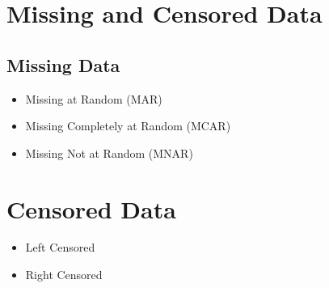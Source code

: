 \section{Missing and Censored Data}
\subsection{Missing Data}


\begin{itemize}
\item Missing at Random (MAR)
\item Missing Completely at Random (MCAR)
\item Missing Not at Random (MNAR)
\end{itemize}

\section{Censored Data}

\begin{itemize}
\item Left Censored
\item Right Censored
\end{itemize}


